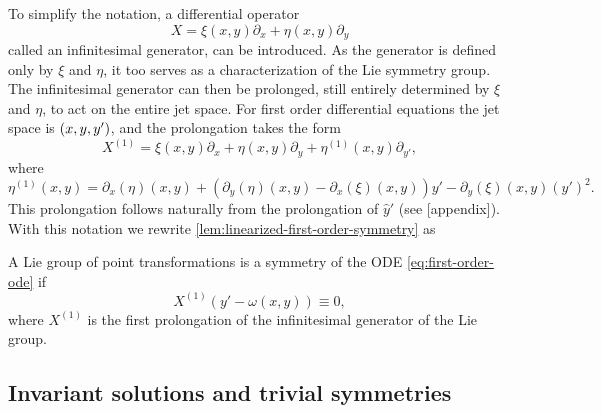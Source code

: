 To simplify the notation, a differential operator
\begin{equation}
  X = \xi(x,y) \partial_x + \eta(x,y) \partial_y
\end{equation}
called an infinitesimal generator, can be introduced.
As the generator is defined only by \(\xi\) and \(\eta\), it too serves as a characterization of the Lie symmetry group.
The infinitesimal generator can then be prolonged, still entirely determined by \(\xi\) and \(\eta\), to act on the entire jet space.
For first order differential equations the jet space is \(\pqty{x, y, y'}\), and the prolongation takes the form
\begin{equation}
  X^{(1)} = \xi(x,y) \partial_x + \eta(x,y) \partial_y + \eta^{(1)}(x,y) \partial_{y'},
\end{equation}
where
\begin{equation}
  \eta^{(1)}(x,y) =
  \partial_x(\eta)(x,y) + (\partial_y(\eta)(x,y) - \partial_x(\xi)(x,y)) y' - \partial_y(\xi)(x,y) \left(y'\right)^2.
\end{equation}
This prolongation follows naturally from the prolongation of \(\hat{y}'\) (see [appendix]). %
With this notation we rewrite \cref{lem:linearized-first-order-symmetry} as
\begin{thm} \label{thm:linearized-first-order-symmetry}
  A Lie group of point transformations is a symmetry of the ODE \ref{eq:first-order-ode} if
  \begin{equation} \label{eq:linearized-first-order-symmetry}
    X^{(1)}\left(y' - \omega(x,y)\right) \equiv 0,
  \end{equation}
  where \(X^{(1)}\) is the first prolongation of the infinitesimal generator of the Lie group.
\end{thm} %


\subsection{Invariant solutions and trivial symmetries}

